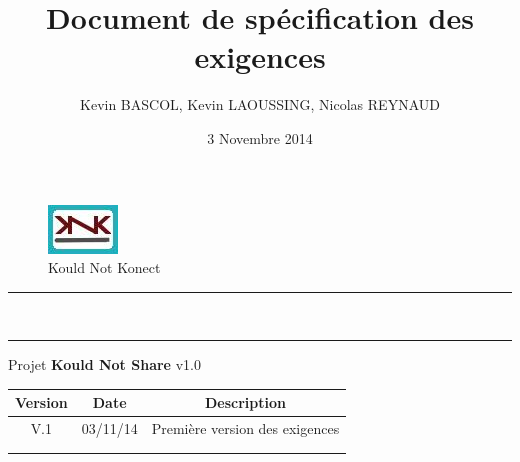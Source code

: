 \documentclass[10pt,a4paper]{report}
\author{Kevin BASCOL, Kevin LAOUSSING, Nicolas REYNAUD}
\title{Document de spécification des exigences}
\date{3 Novembre 2014}
\begin{document}
\makeatletter
	\begin{titlepage}
	
	\begin{figure}
		\begin{minipage}[c]{.46\linewidth}
		\end{minipage} \hfill
		\begin{minipage}[c]{.20\linewidth}
			\begin{center}
				\includegraphics{../Logo/logoKNK.jpg}\\
				{\large Kould Not Konect}
			\end{center}
		\end{minipage}
	\vspace{1cm}
	\end{figure}
	
	\centering
		{
		\hrule height 2pt
		\vspace{0.7cm}
		\Huge \textbf{\@title}}\\
		\vspace{0.7cm}
		\hrule height 2pt
		\vspace{1.5cm}
		{\LARGE  Projet \textbf{Kould Not Share} v1.0}
		
		\vfill
		
		\begin{tabular}{|c|c|c|}
			\hline
			Version & Date & Description\\
			\hline
			V.1 & 03/11/14 & Première version des exigences\\
			\hline
			 & & \\
			\hline
			 & & \\
			\hline
		\end{tabular}\\
		\vspace{1cm}
		\@author\\
		\end{titlepage}
\makeatother
\setcounter{secnumdepth}{5}
\setcounter{tocdepth}{5}
\renewcommand{\contentsname}{Sommaire}
\begingroup\makeatletter
\def\@makeschapterhead#1{%
  {\parindent \z@ \raggedright
    \normalfont
    \interlinepenalty\@M
    \Huge \bfseries  #1\par\nobreak
    \vskip 20pt%
  }}\makeatother
\tableofcontents
\endgroup
\thispagestyle{empty}
\setcounter{page}{0}
\newpage
\end{document}
